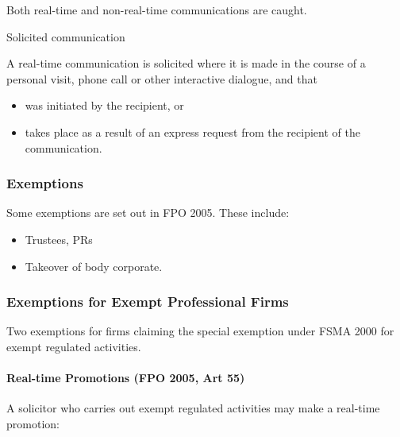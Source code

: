 \documentclass[
]{article}
\providecommand{\tightlist}{%
  \setlength{\itemsep}{0pt}\setlength{\parskip}{0pt}}
\newenvironment{env-86a00e9b-0e00-4fe8-86cd-090a54119c0f}
{
    \savenotes\tcolorbox[blanker,breakable,left=5pt,borderline west={2pt}{-4pt}{gold}]
}
{
    \endtcolorbox\spewnotes
}
\begin{document}
Both real-time and non-real-time communications are caught.

\begin{env-86a00e9b-0e00-4fe8-86cd-090a54119c0f}

Solicited communication

A real-time communication is solicited where it is made in the course of
a personal visit, phone call or other interactive dialogue, and that

\begin{itemize}
\tightlist
\item
  was initiated by the recipient, or
\item
  takes place as a result of an express request from the recipient of
  the communication.
\end{itemize}

\end{env-86a00e9b-0e00-4fe8-86cd-090a54119c0f}

\hypertarget{exemptions}{%
\subsubsection{Exemptions}\label{exemptions}}

Some exemptions are set out in FPO 2005. These include:

\begin{itemize}
\tightlist
\item
  Trustees, PRs
\item
  Takeover of body corporate.
\end{itemize}

\hypertarget{exemptions-for-exempt-professional-firms}{%
\subsubsection{Exemptions for Exempt Professional
Firms}\label{exemptions-for-exempt-professional-firms}}

Two exemptions for firms claiming the special exemption under FSMA 2000
for exempt regulated activities.

\hypertarget{real-time-promotions-fpo-2005-art-55}{%
\paragraph{Real-time Promotions (FPO 2005, Art
55)}\label{real-time-promotions-fpo-2005-art-55}}

A solicitor who carries out exempt regulated activities may make a
real-time promotion:
\end{document}
